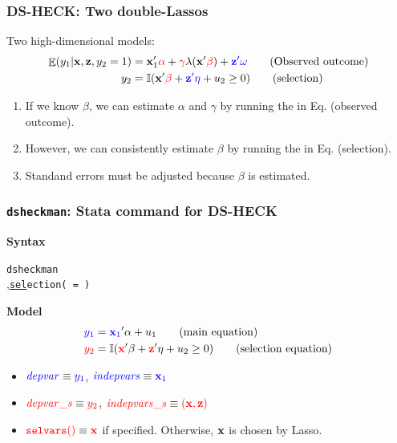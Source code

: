 \documentclass[11pt]{beamer}
\begin{document}
\begin{frame}
  \frametitle{DS-HECK: Two double-Lassos}
Two high-dimensional models:
\begin{align}
\mathop{\mathbb{E}}(y_{1} | \mathbf{x}, \mathbf{z}, y_2 = 1) 
&= \mathbf{x}_1'{\color{red}{\mathbf{\alpha}}} + {\color{red}{\gamma}} \lambda(\mathbf{x}'{\color{red}{\mathbf{\beta}}}) +
{\color{blue}{\mathbf{z}'\omega}} \tag{Observed outcome} \\
y_{2} &=\mathbb{I}(\mathbf{x}'{\color{red}{\mathbf{\beta}}}+  {\color{blue}{\mathbf{z}'\mathbf{\eta}}} + u_{2} \geq 0) 
\tag{selection}
\end{align}

\vskip 1cm
\begin{enumerate}
  \setlength{\itemsep}{1em}
\item If we know $\beta$, we can estimate $\alpha$ and $\gamma$ by running the
   in Eq. (observed outcome). 

\item However, we can consistently estimate $\beta$ by running the
   in Eq. (selection).

\item Standand errors must be adjusted because $\beta$ is estimated.
\end{enumerate}
\end{frame}

\begin{frame}
  \frametitle{ {\tt dsheckman}: Stata command for DS-HECK}
{\bf Syntax}
\begin{stsyntax}
{\tt dsheckman}\
\myblue{\depvar}\
\
\optif
\optin\\
\qquad \qquad \qquad
,{\tt \underline{sel}ection( = )}\\
\qquad \qquad \qquad
{}
\end{stsyntax}

{\bf Model}
\begin{align}
  {\color{blue}{y_{1}}} &= {\color{blue}{\mathbf{x}_{1}}}'\mathbf{\alpha} + u_{1}  \tag{main equation}\\
  {\color{red}{y_{2}}} &=\mathbb{I}({\color{red}{\mathbf{x}}}'\mathbf{\beta}+  {\color{red}{\mathbf{z}}}' \mathbf{\eta} + u_{2} \geq
  0)
  \tag{selection equation}
\end{align}

\begin{itemize}
  \item ${\color{blue}{\it depvar}} \equiv {\color{blue}{y_1}}$,  ${\color{blue}{\it indepvars}}
    \equiv {\color{blue}{\mathbf{x}_1}}$
  \item ${\color{red}{\it depvar\_s}} \equiv {\color{red}{y_2}}$, ${\color{red}{\it
    indepvars\_s}}\equiv {\color{red}{(\mathbf{x}, \mathbf{z})}}$
  \item ${\color{red}{\tt selvars()}} \equiv {\color{red}{\mathbf{x}}}$ if specified. Otherwise,
    $\mathbf{x}$ is chosen by Lasso.
\end{itemize}
\end{frame}
\end{document}

